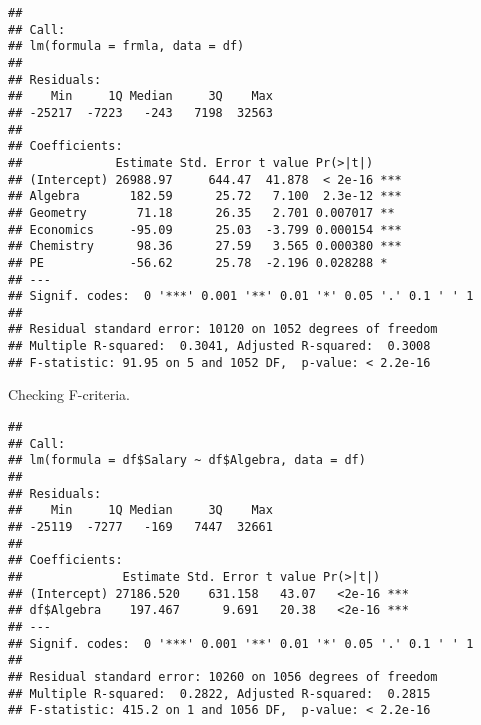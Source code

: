 \documentclass[
]{article}
\newenvironment{Shaded}{\begin{snugshade}}{\end{snugshade}}
\newcommand{\AttributeTok}[1]{\textcolor[rgb]{0.77,0.63,0.00}{#1}}
\newcommand{\FunctionTok}[1]{\textcolor[rgb]{0.00,0.00,0.00}{#1}}
\newcommand{\NormalTok}[1]{#1}
\newcommand{\SpecialCharTok}[1]{\textcolor[rgb]{0.00,0.00,0.00}{#1}}
\begin{document}
\begin{verbatim}
## 
## Call:
## lm(formula = frmla, data = df)
## 
## Residuals:
##    Min     1Q Median     3Q    Max 
## -25217  -7223   -243   7198  32563 
## 
## Coefficients:
##             Estimate Std. Error t value Pr(>|t|)    
## (Intercept) 26988.97     644.47  41.878  < 2e-16 ***
## Algebra       182.59      25.72   7.100  2.3e-12 ***
## Geometry       71.18      26.35   2.701 0.007017 ** 
## Economics     -95.09      25.03  -3.799 0.000154 ***
## Chemistry      98.36      27.59   3.565 0.000380 ***
## PE            -56.62      25.78  -2.196 0.028288 *  
## ---
## Signif. codes:  0 '***' 0.001 '**' 0.01 '*' 0.05 '.' 0.1 ' ' 1
## 
## Residual standard error: 10120 on 1052 degrees of freedom
## Multiple R-squared:  0.3041, Adjusted R-squared:  0.3008 
## F-statistic: 91.95 on 5 and 1052 DF,  p-value: < 2.2e-16
\end{verbatim}

Checking F-criteria.

\begin{Shaded}
\end{Shaded}

\begin{verbatim}
## 
## Call:
## lm(formula = df$Salary ~ df$Algebra, data = df)
## 
## Residuals:
##    Min     1Q Median     3Q    Max 
## -25119  -7277   -169   7447  32661 
## 
## Coefficients:
##              Estimate Std. Error t value Pr(>|t|)    
## (Intercept) 27186.520    631.158   43.07   <2e-16 ***
## df$Algebra    197.467      9.691   20.38   <2e-16 ***
## ---
## Signif. codes:  0 '***' 0.001 '**' 0.01 '*' 0.05 '.' 0.1 ' ' 1
## 
## Residual standard error: 10260 on 1056 degrees of freedom
## Multiple R-squared:  0.2822, Adjusted R-squared:  0.2815 
## F-statistic: 415.2 on 1 and 1056 DF,  p-value: < 2.2e-16
\end{verbatim}

\begin{Shaded}
\end{Shaded}
\end{document}
